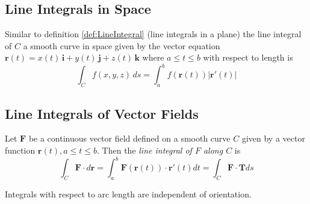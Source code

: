 \documentclass[../main.tex]{subfiles}
\begin{document}
\subsection{Line Integrals in Space}
Similar to definition \ref{def:LineIntegral} (line integrals in a plane) the line integral of $C$ a smooth curve in space given by the vector equation $\textbf{r}(t) = x(t)\,\textbf{i} + y(t)\,\textbf{j} + z(t)\,\textbf{k}$ where $a\le t\le b$ with respect to length is
\begin{equation*}
	\int_C{f(x,y,z)\,ds} = \int_a^b{f(\textbf{r}(t))|\textbf{r}'(t)|}
\end{equation*}

\subsection{Line Integrals of Vector Fields}
\begin{definition}
Let $\textbf{F}$ be a continuous vector field defined on a smooth curve $C$ given by a vector function $\textbf{r}(t), a\le t \le b$. Then the \textit{line integral of $F$ along $C$} is
\begin{equation*}
\int_C{\textbf{F}\cdot d\textbf{r}} = \int_a^b{\textbf{F}(\textbf{r}(t))\cdot \textbf{r}'(t) dt = \int_C{\textbf{F}\cdot\textbf{T}ds}}
\end{equation*}
\end{definition}
Integrals with respect to arc length are independent of orientation.
\end{document}
